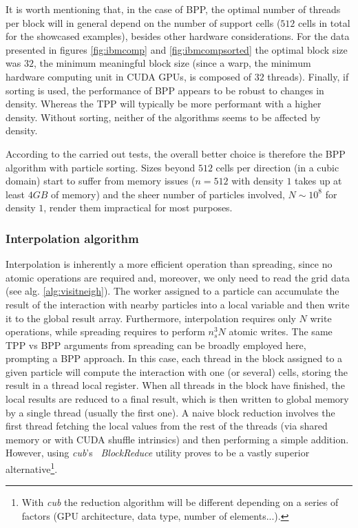 \documentclass[twoside,openright,titlepage,numbers=noenddot,%
headinclude,footinclude,cleardoublepage=empty,abstract=on,
BCOR=5mm,fontsize=11pt, dvipsnames, paper=b5
]{scrreprt}
\begin{document}
It is worth mentioning that, in the case of BPP, the optimal number of threads per block will in general depend on the number of support cells ($512$ cells in total for the showcased examples), besides other hardware considerations. For the data presented in figures \ref{fig:ibmcomp} and \ref{fig:ibmcompsorted} the optimal block size was $32$, the minimum meaningful block size (since a warp, the minimum hardware computing unit in CUDA GPUs, is composed of $32$ threads).
Finally, if sorting is used, the performance of BPP appears to be robust to changes in density. Whereas the TPP will typically be more performant with a higher density. Without sorting, neither of the algorithms seems to be affected by density.

According to the carried out tests, the overall better choice is therefore the BPP algorithm with particle sorting.
Sizes beyond $512$ cells per direction (in a cubic domain) start to suffer from memory issues ($n=512$ with density $1$ takes up at least $4GB$ of memory) and the sheer number of particles involved, $N\sim 10^8$ for density $1$, render them impractical for most purposes.


\subsubsection*{Interpolation algorithm}
Interpolation is inherently a more efficient operation than spreading, since no atomic operations are required and, moreover, we only need to read the grid data (see alg. \ref{alg:visitneigh}). The worker assigned to a particle can accumulate the result of the interaction with nearby particles into a local variable and then write it to the global result array. Furthermore, interpolation requires only $N$ write operations, while spreading requires to perform $n_s^3N$ atomic writes.
The same TPP vs BPP arguments from spreading can be broadly employed here, prompting a BPP approach. In this case, each thread in the block assigned to a given particle will compute the interaction with one (or several) cells, storing the result in a thread local register.
When all threads in the block have finished, the local results are reduced to a final result, which is then written to global memory by a single thread (usually the first one).
A naive block reduction involves the first thread fetching the local values from the rest of the threads (via shared memory or with CUDA shuffle intrinsics) and then performing a simple addition. However, using \emph{cub}'s~\cite{cub} \emph{BlockReduce} utility proves to be a vastly superior alternative\footnote{With \emph{cub} the reduction algorithm will be different depending on a series of factors (GPU architecture, data type, number of elements...).}.
\end{document}
